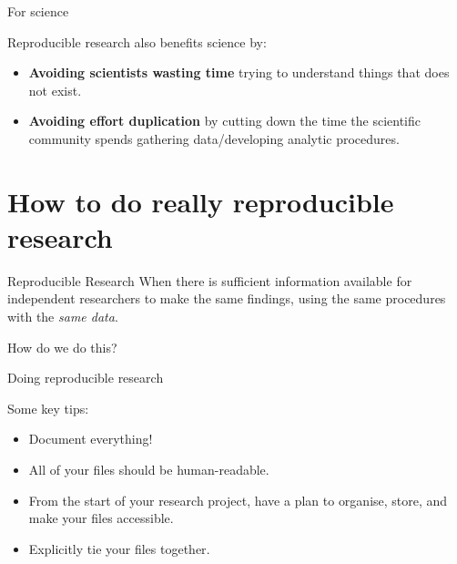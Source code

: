 \documentclass[10pt]{beamer}
\begin{document}
\begin{frame}{For science}

    Reproducible research also benefits science by:

    \begin{itemize}
        \item \textbf{Avoiding scientists wasting time} trying to understand things that does not exist.

        \vspace{0.5cm}

        \item \textbf{Avoiding effort duplication} by cutting down the time the scientific community spends gathering data/developing analytic procedures.
    \end{itemize}


\end{frame}

\section{How to do really reproducible research}

\begin{frame}

\begin{exampleblock}{Reproducible Research}
    When there is sufficient information available for independent researchers to make the same findings, using the same procedures with the \emph{same data}.
\end{exampleblock}

    \vspace{1cm}

    \begin{center}
        {\LARGE{How do we do this?}}
    \end{center}

\end{frame}

\begin{frame}{Doing reproducible research}

    {\large{Some key tips:}}

    \begin{itemize}

        \item \alert{Document everything!}

        \item All of your files should be \alert{human-readable}.

        \item \alert{From the start} of your research project, have a plan to \alert{organise}, store, and make your files accessible.

        \item Explicitly \alert{tie your files together}.
    \end{itemize}

\end{frame}
\end{document}
